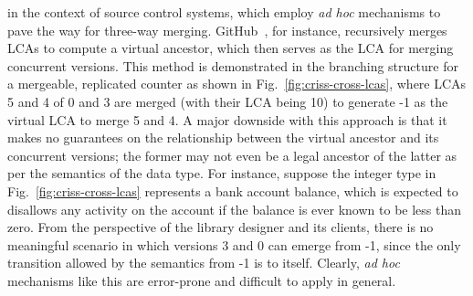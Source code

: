 in the context of source control systems, which employ \emph{ad hoc}
mechanisms to pave the way for three-way merging.
GitHub~\cite{github}, for instance, recursively merges LCAs to compute
a virtual ancestor, which then serves as the LCA for merging
concurrent versions. This method is demonstrated in the branching
structure for a mergeable, replicated counter as shown in
Fig.~\ref{fig:criss-cross-lcas}, where LCAs 5 and 4 of 0 and 3 are
merged (with their LCA being 10) to generate -1 as the virtual LCA to
merge 5 and 4. A major downside with this approach is that it makes no
guarantees on the relationship between the virtual ancestor and its
concurrent versions; the former may not even be a legal ancestor of
the latter as per the semantics of the data type. For instance,
suppose the integer type in Fig.~\ref{fig:criss-cross-lcas} represents
a bank account balance, which is expected to disallows any activity on
the account if the balance is ever known to be less than zero.  From
the perspective of the library designer and its clients, there is no
meaningful scenario in which versions 3 and 0 can emerge from -1,
since the only transition allowed by the semantics from -1 is to
itself.  Clearly, \emph{ad hoc} mechanisms like this are error-prone
and difficult to apply in general.

